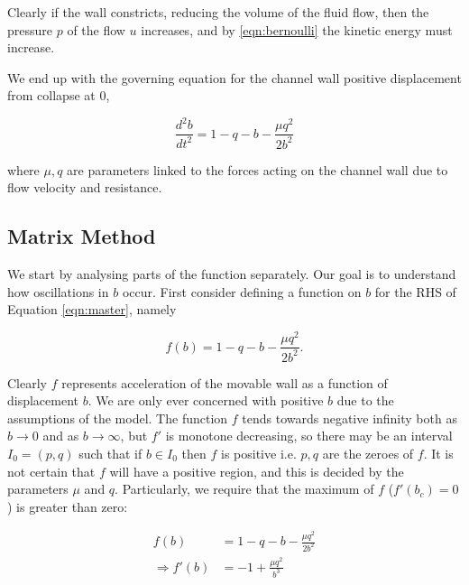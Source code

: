 \documentclass{article}
\begin{document}
Clearly if the wall constricts, reducing the volume of the fluid flow,
then the pressure $p$ of the flow $u$ increases,
and by \ref{eqn:bernoulli} the kinetic energy must increase.



We end up with the governing equation for the channel wall positive displacement from collapse at $0$,

\begin{equation}
    \frac{d^2b}{dt^2} = 1 - q - b - \frac{\mu q^2}{2b^2}
    \label{eqn:master}
\end{equation}

where $\mu, q$ are parameters linked to the forces acting on the channel wall due to flow velocity and resistance.

\subsection{Matrix Method}

We start by analysing parts of the function separately.
Our goal is to understand how oscillations in $b$ occur.
First consider defining a function on $b$ for the RHS of Equation \ref{eqn:master},
namely

\begin{equation}
    f(b) = 1 - q - b - \frac{\mu q^2}{2b^2}.
\end{equation}

Clearly $f$ represents acceleration of the movable wall as a function of displacement $b$.
We are only ever concerned with positive $b$ due to the assumptions of the model.
The function $f$ tends towards negative infinity both as $b\rightarrow 0$ and as $b\rightarrow\infty$,
but $f'$ is monotone decreasing, so there may be an interval $I_0=(p,q)$ such that if $b\in I_0$
then $f$ is positive i.e. $p,q$ are the zeroes of $f$.
It is not certain that $f$ will have a positive region,
and this is decided by the parameters $\mu$ and $q$.
Particularly, we require that the maximum of $f$ ($f'(b_c) = 0$) is greater than zero:


\begin{align}
    f(b) &= 1 - q - b - \frac{\mu q^2}{2b^2} \\
    \Rightarrow f'(b) &= -1 + \frac{\mu q^2}{b^3}
\end{align}
\end{document}
